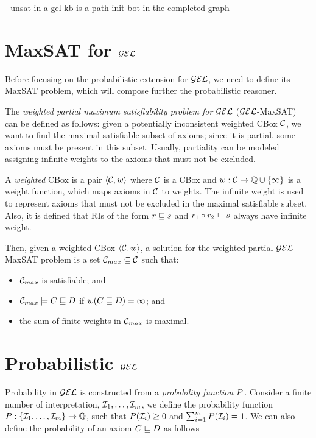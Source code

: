 
- unsat in a gel-kb is a path init-bot in the completed graph



\section{MaxSAT for \texorpdfstring{$\mathcal{GEL}$}{������}}
\label{sec:maxgel}

Before focusing on the probabilistic extension for $\mathcal{GEL}$, we need to define its MaxSAT problem, which will compose further the probabilistic reasoner.

The \emph{weighted partial maximum satisfiability problem for} $\mathcal{GEL}$ ($\mathcal{GEL}$-MaxSAT) can be defined as follows: given a potentially inconsistent weighted CBox $\mathcal{C}$, we want to find the maximal satisfiable subset of axioms; since it is partial, some axioms must be present in this subset. Usually, partiality can be modeled assigning infinite weights to the axioms that must not be excluded.

A \emph{weighted} CBox is a pair $\langle\mathcal{C}, w\rangle$ where $\mathcal{C}$ is a CBox and $w: \mathcal{C} \to \mathbb{Q} \cup \{\infty\}$ is a weight function, which maps axioms in $\mathcal{C}$ to weights. The infinite weight is used to represent axioms that must not be excluded in the maximal satisfiable subset. Also, it is defined that RIs of the form $r \sqsubseteq s$ and $r_1 \circ r_2 \sqsubseteq s$ always have infinite weight.

Then, given a weighted CBox $\langle\mathcal{C}, w\rangle$, a solution for the weighted partial $\mathcal{GEL}$-MaxSAT problem is a set $\mathcal{C}_{max} \subseteq \mathcal{C}$ such that:
\begin{itemize}
	\item $\mathcal{C}_{max}$ is satisfiable; and
	\item $\mathcal{C}_{max} \models C \sqsubseteq D$ if $w(C \sqsubseteq D) = \infty$; and
	\item the sum of finite weights in $\mathcal{C}_{max}$ is maximal.
\end{itemize}

\section{Probabilistic \texorpdfstring{$\mathcal{GEL}$}{������}}
\label{sec:pgel}

Probability in $\mathcal{GEL}$ is constructed from a \emph{probability function} $P$ \citep{Fin2020}. Consider a finite number of interpretation, $\mathcal{I}_1, \dots, \mathcal{I}_m$, we define the probability function $P: \{\mathcal{I}_1, \dots, \mathcal{I}_m\} \to \mathbb{Q}$, such that $P(\mathcal{I}_i) \geq 0$ and $\sum_{i = 1}^m P(\mathcal{I}_i) = 1$. We can also define the probability of an axiom $C \sqsubseteq D$ as follows

